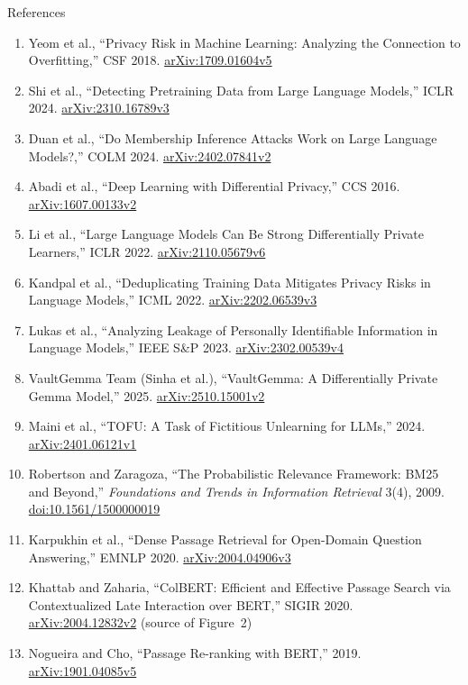 \begin{frame}[allowframebreaks]{References}
\begin{enumerate}
    \item Yeom et al., ``Privacy Risk in Machine Learning: Analyzing the Connection to Overfitting,'' CSF 2018. \href{https://arxiv.org/abs/1709.01604v5}{arXiv:1709.01604v5}
    \item Shi et al., ``Detecting Pretraining Data from Large Language Models,'' ICLR 2024. \href{https://arxiv.org/abs/2310.16789v3}{arXiv:2310.16789v3}
    \item Duan et al., ``Do Membership Inference Attacks Work on Large Language Models?,'' COLM 2024. \href{https://arxiv.org/abs/2402.07841v2}{arXiv:2402.07841v2}
    \item Abadi et al., ``Deep Learning with Differential Privacy,'' CCS 2016. \href{https://arxiv.org/abs/1607.00133v2}{arXiv:1607.00133v2}
    \item Li et al., ``Large Language Models Can Be Strong Differentially Private Learners,'' ICLR 2022. \href{https://arxiv.org/abs/2110.05679v6}{arXiv:2110.05679v6}
    \item Kandpal et al., ``Deduplicating Training Data Mitigates Privacy Risks in Language Models,'' ICML 2022. \href{https://arxiv.org/abs/2202.06539v3}{arXiv:2202.06539v3}
    \item Lukas et al., ``Analyzing Leakage of Personally Identifiable Information in Language Models,'' IEEE S\&P 2023. \href{https://arxiv.org/abs/2302.00539v4}{arXiv:2302.00539v4}
    \item VaultGemma Team (Sinha et al.), ``VaultGemma: A Differentially Private Gemma Model,'' 2025. \href{https://arxiv.org/abs/2510.15001v2}{arXiv:2510.15001v2}
    \item Maini et al., ``TOFU: A Task of Fictitious Unlearning for LLMs,'' 2024. \href{https://arxiv.org/abs/2401.06121v1}{arXiv:2401.06121v1}
    \item Robertson and Zaragoza, ``The Probabilistic Relevance Framework: BM25 and Beyond,'' \textit{Foundations and Trends in Information Retrieval} 3(4), 2009. \href{https://doi.org/10.1561/1500000019}{doi:10.1561/1500000019}
    \item Karpukhin et al., ``Dense Passage Retrieval for Open-Domain Question Answering,'' EMNLP 2020. \href{https://arxiv.org/abs/2004.04906v3}{arXiv:2004.04906v3}
    \item Khattab and Zaharia, ``ColBERT: Efficient and Effective Passage Search via Contextualized Late Interaction over BERT,'' SIGIR 2020. \href{https://arxiv.org/abs/2004.12832v2}{arXiv:2004.12832v2} (source of Figure~2)
    \item Nogueira and Cho, ``Passage Re-ranking with BERT,'' 2019. \href{https://arxiv.org/abs/1901.04085v5}{arXiv:1901.04085v5}

\end{enumerate}
\end{frame}
